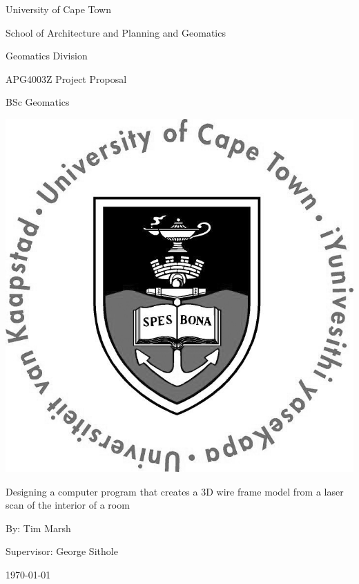 \begin{center}
{\Huge University of Cape Town}
\linebreak \linebreak

{\LARGE School of Architecture and Planning and Geomatics}
\linebreak \linebreak

{\Large Geomatics Division}
\linebreak \linebreak


{\Large APG4003Z Project Proposal}
\linebreak

{\Large BSc Geomatics}
\linebreak \linebreak

\begin{center}
\includegraphics[width=0.5\linewidth]{includes/images/UCTcircular_logo1_CMYK.jpg}
\linebreak \linebreak
\end{center}

{\Large Designing a computer program that creates a 3D wire frame model from a laser scan of the interior of a room}
\linebreak \linebreak

{\Large By: Tim Marsh}
\linebreak \linebreak

{\Large Supervisor: George Sithole}
\linebreak \linebreak

{\Large \today}

\end{center}
